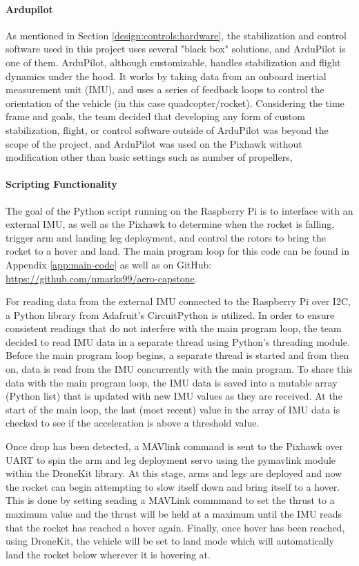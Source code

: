 \paragraph{Ardupilot}
As mentioned in Section \ref{design:controls:hardware}, the stabilization and control software used in this project uses several "black box" solutions, and ArduPilot is one of them. ArduPilot, although customizable, handles stabilization and flight dynamics under the hood. It works by taking data from an onboard inertial measurement unit (IMU), and uses a series of feedback loops to control the orientation of the vehicle (in this case quadcopter/rocket).
Considering the time frame and goals, the team decided that developing any form of custom stabilization, flight, or control software outside of ArduPilot was beyond the scope of the project, and ArduPilot was used on the Pixhawk without modification other than basic settings such as number of propellers, 

\paragraph{Scripting Functionality}
The goal of the Python script running on the Raspberry Pi is to interface with an external IMU, as well as the Pixhawk to determine when the rocket is falling, trigger arm and landing leg deployment, and control the rotors to bring the rocket to a hover and land. The main program loop for this code can be found in Appendix \ref{app:main-code} as well as on GitHub: \url{https://github.com/nmarks99/aero-capstone}. 

For reading data from the external IMU connected to the Raspberry Pi over I2C, a Python library from Adafruit's CircuitPython is utilized. In order to ensure consistent readings that do not interfere with the main program loop, the team decided to read IMU data in a separate thread using Python's threading module. Before the main program loop begins, a separate thread is started and from then on, data is read from the IMU concurrently with the main program. To share this data with the main program loop, the IMU data is saved into a mutable array (Python list) that is updated with new IMU values as they are received. At the start of the main loop, the last (most recent) value in the array of IMU data is checked to see if the acceleration is above a threshold value. 

Once drop has been detected, a MAVlink command is sent to the Pixhawk over UART to spin the arm and leg deployment servo using the pymavlink module within the DroneKit library. At this stage, arms and legs are deployed and now the rocket can begin attempting to slow itself down and bring itself to a hover. This is done by setting sending a MAVLink commmand to set the thrust to a maximum value and the thrust will be held at a maximum until the IMU reads that the rocket has reached a hover again. Finally, once hover has been reached, using DroneKit, the vehicle will be set to land mode which will automatically land the rocket below wherever it is hovering at.


